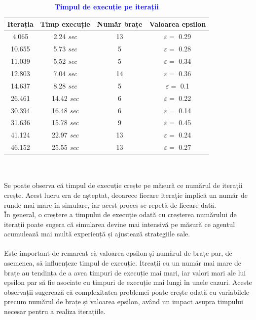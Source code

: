 \documentclass{article}
\begin{document}
\begin{table}[ht]
    \centering
    \begin{tabular}{|c|c|c|c|}
    \hline \textbf{Iterația} & \textbf{Timp execuție} & \textbf{Număr brațe}  & \textbf{Valoarea epsilon} \\
    \hline  4.065     &  2.24 \textit{sec}    & 13   &  $\varepsilon = $ 0.29\\
    \hline  10.655    &  5.73  \textit{sec}   &  5   &  $\varepsilon = $ 0.28\\
    \hline  11.039    &  5.52 \textit{sec}    &  5   &  $\varepsilon = $ 0.34\\
    \hline  12.803    &  7.04 \textit{sec}    &  14  &  $\varepsilon = $ 0.36\\
    \hline  14.637    &  8.28 \textit{sec}    &  5   &  $\varepsilon = $ 0.1\\
    \hline  26.461    &  14.42 \textit{sec}   &  6   & $\varepsilon = $ 0.22\\
    \hline  30.394    &  16.48 \textit{sec}   &  6   &  $\varepsilon = $ 0.14\\
    \hline  31.636    &  15.78 \textit{sec}   &  9   & $\varepsilon = $ 0.45\\
    \hline  41.124    &  22.97 \textit{sec}   &  13  &  $\varepsilon = $ 0.24\\
    \hline  46.152    &  25.55 \textit{sec}   &  13  &  $\varepsilon = $ 0.27\\
    \hline
    \end{tabular}
    \bfseries\caption{\textbf{\textcolor{blue}{Timpul de execuție pe iterații}}}
    \label{tab:execution-time}
\end{table}
\\\\Se poate observa că timpul de execuție crește  pe măsură ce numărul de iterații crește. Acest lucru era de așteptat, deoarece fiecare iterație implică un număr de runde mai mare în simulare, iar acest proces se repetă de fiecare dată.\\
În general, o creștere a timpului de execuție odată cu creșterea numărului de iterații poate sugera că simularea devine mai intensivă pe măsură ce agentul acumulează mai multă experiență și ajustează strategiile sale.\\\\
Este important de remarcat că valoarea epsilon și numărul de brațe par, de asemenea, să influențeze timpul de execuție. Itreații cu un număr mai mare de brațe au tendința de a avea timpuri de execuție mai mari, iar valori mari ale lui epsilon par să fie asociate cu timpuri de execuție mai lungi în unele cazuri. Aceste observații sugerează că complexitatea problemei poate crește odată cu variabilele precum numărul de brațe și valoarea epsilon, având un impact asupra timpului necesar pentru a realiza iterațiile.
\end{document}
